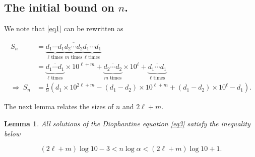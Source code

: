 \documentclass[10pt,a4paper]{article}
\newtheorem{lemma}{Lemma}
\begin{document}
\subsection{The initial bound on $n$.}
We note that \eqref{eq1} can be rewritten as

\begin{align}\label{eq3}
S_n & = \overline{\underbrace{d_1\cdots d_1}_\text{$\ell$ times} \underbrace{d_2\cdots d_2}_\text{$m$ times} \underbrace{d_1\cdots d_1}_\text{$\ell$ times}} \nonumber \\
& = \overline{\underbrace{d_1\cdots d_1}_\text{$\ell$ times}} \times 10^{\ell + m} + \overline{ \underbrace{d_2\cdots d_2}_\text{$m$ times}} \times 10^\ell + \overline{\underbrace{d_1\cdots d_1}_\text{$\ell$ times}} \nonumber \\
\Rightarrow ~S_n & = \frac{1}{9} \left(d_1 \times 10^{2\ell + m} - (d_1 - d_2) \times 10^{\ell+m} + (d_1-d_2) \times 10^\ell -  d_1 \right).
\end{align}

\noindent The next lemma relates the sizes of $n$ and $2\ell + m$.

\begin{lemma}\label{l4}
All solutions of the Diophantine equation \eqref{eq3} satisfy the inequality below

\begin{equation*}
(2\ell + m) \log 10 - 3 < n \log \alpha < (2\ell + m) \log 10 + 1.
\end{equation*}

\end{lemma}
\end{document}
